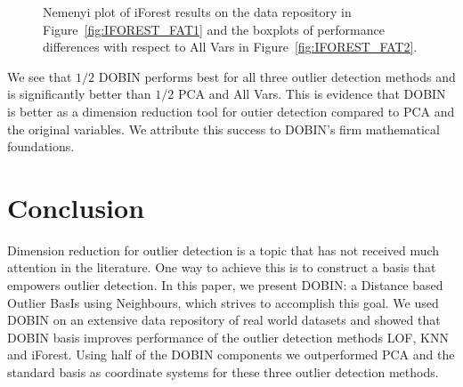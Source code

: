 \documentclass[a4paper,12pt]{article}
\begin{document}
\begin{figure}[!ht]
	\centering
	\hfill
	\caption{Nemenyi plot of iForest results on the data repository in Figure~\ref{fig:IFOREST_FAT1} and the boxplots of performance differences with respect to All Vars in  Figure~\ref{fig:IFOREST_FAT2}.}
	\label{fig:IFOREST_FAT}
\end{figure}

We see that $1/2$ DOBIN performs best for all three outlier detection methods and is significantly better than $1/2$ PCA and All Vars. This is evidence that DOBIN is better as a dimension reduction tool for outier detection compared to PCA and the original variables. We attribute this success to DOBIN's firm mathematical foundations.

\section{Conclusion}

Dimension reduction for outlier detection is a topic that has not received much attention in the literature. One way to achieve this is to construct a basis that empowers outlier detection. In this paper, we present DOBIN: a Distance based Outlier BasIs using Neighbours, which strives to accomplish this goal. We used DOBIN on an extensive data repository of real world datasets and showed that DOBIN basis improves performance of the outlier detection methods LOF, KNN and iForest. Using half of the DOBIN components we outperformed PCA and the standard basis as coordinate systems for these three outlier detection methods.
\end{document}
